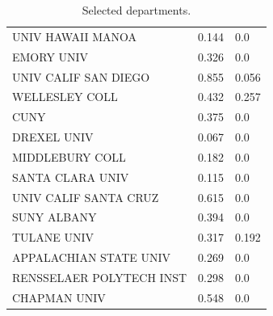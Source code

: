 \begin{table}[!ht]
{\begin{tabular}{lll}
        UNIV HAWAII MANOA        & 0.144 & 0.0         \\
        EMORY UNIV               & 0.326 & 0.0         \\
        UNIV CALIF SAN DIEGO     & 0.855 & 0.056       \\
        WELLESLEY COLL           & 0.432 & 0.257       \\
        CUNY                     & 0.375 & 0.0         \\
        DREXEL UNIV              & 0.067 & 0.0         \\
        MIDDLEBURY COLL         & 0.182 & 0.0         \\
        SANTA CLARA UNIV         & 0.115 & 0.0         \\
        UNIV CALIF SANTA CRUZ    & 0.615 & 0.0         \\
        SUNY ALBANY              & 0.394 & 0.0         \\
        TULANE UNIV              & 0.317 & 0.192       \\
        APPALACHIAN STATE UNIV   & 0.269 & 0.0         \\
        RENSSELAER POLYTECH INST & 0.298 & 0.0         \\
        CHAPMAN UNIV             & 0.548 & 0.0         \\ \hline
    \end{tabular}}
    \caption{Selected departments.}
    \label{tab:dep_field}
\end{table}

\clearpage

